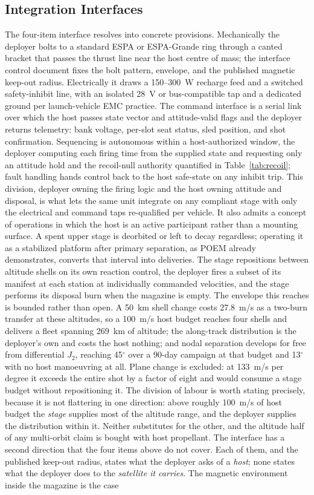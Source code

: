 \documentclass[conference]{IEEEtran}
\begin{document}
\subsection{Integration Interfaces}
The four-item interface resolves into concrete provisions. Mechanically the deployer bolts to a standard ESPA or ESPA-Grande ring through a canted bracket that passes the thrust line near the host centre of mass; the interface control document fixes the bolt pattern, envelope, and the published magnetic keep-out radius. Electrically it draws a 150--300~W recharge feed and a switched safety-inhibit line, with an isolated 28~V or bus-compatible tap and a dedicated ground per launch-vehicle EMC practice. The command interface is a serial link over which the host passes state vector and attitude-valid flags and the deployer returns telemetry: bank voltage, per-slot seat status, sled position, and shot confirmation. Sequencing is autonomous within a host-authorized window, the deployer computing each firing time from the supplied state and requesting only an attitude hold and the recoil-null authority quantified in Table~\ref{tab:recoil}; fault handling hands control back to the host safe-state on any inhibit trip. This division, deployer owning the firing logic and the host owning attitude and disposal, is what lets the same unit integrate on any compliant stage with only the electrical and command taps re-qualified per vehicle. It also admits a concept of operations in which the host is an active participant rather than a mounting surface. A spent upper stage is deorbited or left to decay regardless; operating it as a stabilized platform after primary separation, as POEM already demonstrates, converts that interval into deliveries. The stage repositions between altitude shells on its own reaction control, the deployer fires a subset of its manifest at each station at individually commanded velocities, and the stage performs its disposal burn when the magazine is empty. The envelope this reaches is bounded rather than open. A 50~km shell change costs 27.8~m/s as a two-burn transfer at these altitudes, so a 100~m/s host budget reaches four shells and delivers a fleet spanning 269~km of altitude; the along-track distribution is the deployer's own and costs the host nothing; and nodal separation develops for free from differential $J_2$, reaching 45$^\circ$ over a 90-day campaign at that budget and 13$^\circ$ with no host manoeuvring at all. Plane change is excluded: at 133~m/s per degree it exceeds the entire shot by a factor of eight and would consume a stage budget without repositioning it. The division of labour is worth stating precisely, because it is not flattering in one direction: above roughly 100~m/s of host budget the \emph{stage} supplies most of the altitude range, and the deployer supplies the distribution within it. Neither substitutes for the other, and the altitude half of any multi-orbit claim is bought with host propellant. The interface has a second direction that the four items above do not cover. Each of them, and the published keep-out radius, states what the deployer asks of a \emph{host}; none states what the deployer does to the \emph{satellite it carries}. The magnetic environment inside the magazine is the case 
\end{document}
